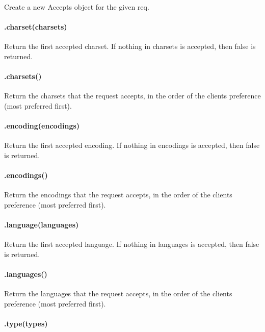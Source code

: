 Create a new {\ttfamily Accepts} object for the given {\ttfamily req}.

\paragraph*{.charset(charsets)}

Return the first accepted charset. If nothing in {\ttfamily charsets} is accepted, then {\ttfamily false} is returned.

\paragraph*{.charsets()}

Return the charsets that the request accepts, in the order of the client\textquotesingle{}s preference (most preferred first).

\paragraph*{.encoding(encodings)}

Return the first accepted encoding. If nothing in {\ttfamily encodings} is accepted, then {\ttfamily false} is returned.

\paragraph*{.encodings()}

Return the encodings that the request accepts, in the order of the client\textquotesingle{}s preference (most preferred first).

\paragraph*{.language(languages)}

Return the first accepted language. If nothing in {\ttfamily languages} is accepted, then {\ttfamily false} is returned.

\paragraph*{.languages()}

Return the languages that the request accepts, in the order of the client\textquotesingle{}s preference (most preferred first).

\paragraph*{.type(types)}

